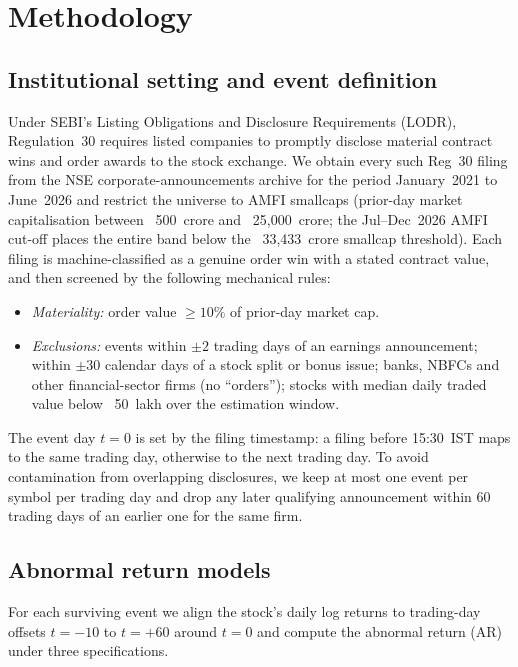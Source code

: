 \section{Methodology}
\label{sec:method}

\subsection{Institutional setting and event definition}
\label{sec:events}

Under SEBI's Listing Obligations and Disclosure Requirements (LODR),
Regulation~30 requires listed companies to promptly disclose material
contract wins and order awards to the stock exchange. We obtain every such
Reg~30 filing from the NSE corporate-announcements archive for the period
January~2021 to June~2026 and restrict the universe to AMFI smallcaps
(prior-day market capitalisation between \rupee~500~crore and
\rupee~25,000~crore; the Jul--Dec~2026 AMFI cut-off places the entire band
below the \rupee~33,433~crore smallcap threshold). Each filing is
machine-classified as a genuine order win with a stated contract value, and
then screened by the following mechanical rules:

\begin{itemize}
  \item \emph{Materiality:} order value $\geq 10\%$ of prior-day market cap.
  \item \emph{Exclusions:} events within $\pm2$ trading days of an earnings
    announcement; within $\pm30$ calendar days of a stock split or bonus
    issue; banks, NBFCs and other financial-sector firms (no ``orders'');
    stocks with median daily traded value below \rupee~50~lakh over the
    estimation window.
\end{itemize}

The event day $t=0$ is set by the filing timestamp: a filing before
15:30~IST maps to the same trading day, otherwise to the next trading day.
To avoid contamination from overlapping disclosures, we keep at most one
event per symbol per trading day and drop any later qualifying
announcement within 60 trading days of an earlier one for the same firm.

\subsection{Abnormal return models}
\label{sec:armodels}

For each surviving event we align the stock's daily log returns to
trading-day offsets $t=-10$ to $t=+60$ around $t=0$ and compute the
abnormal return (AR) under three specifications.

